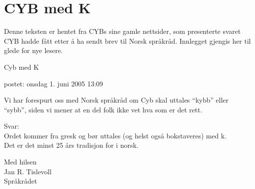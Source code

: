 \documentclass[../../main.tex]{subfiles}
\begin{document}
\chapter{CYB med K}

Denne teksten er hentet fra CYBs sine gamle nettsider, som presenterte svaret CYB hadde fått etter å ha sendt brev til Norsk språkråd. Innlegget gjengis her til glede for nye lesere.

\begin{displayquote}
	Cyb med K
	
	postet: onsdag 1. juni 2005 13:09
	
	Vi har forespurt oss med Norsk språkråd om Cyb skal uttales ``kybb'' eller ``sybb'', siden vi mener at en del folk ikke vet hva som er det rett. 
	
	Svar: \\
	Ordet kommer fra gresk og bør uttales (og helst også bokstaveres) med k. \\
	Det er det minst 25 års tradisjon for i norsk. 
	
	Med hilsen \\
	Jan R. Tislevoll \\
	Språkrådet
\end{displayquote}
\end{document}
